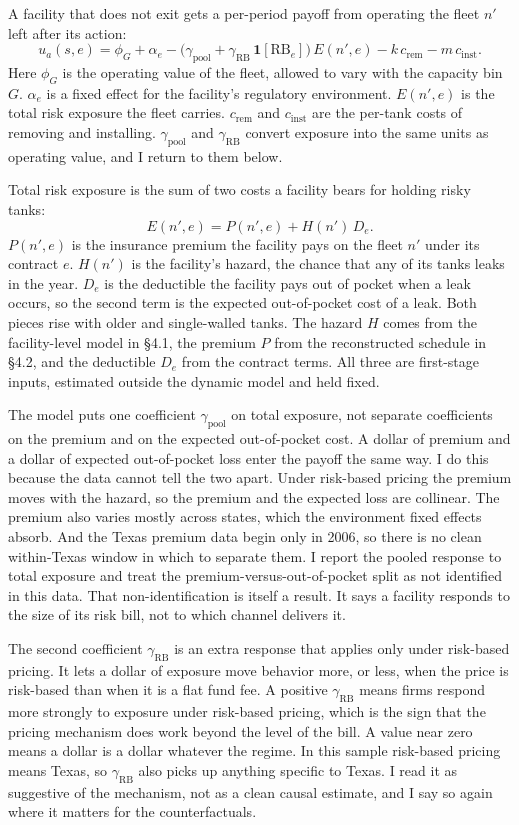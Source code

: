 \documentclass[
  12pt,
]{article}
\begin{document}
A facility that does not exit gets a per-period payoff from operating
the fleet \(n'\) left after its action:
\[u_a(s,e)=\phi_G+\alpha_e-\big(\gamma_{\text{pool}}+\gamma_{\text{RB}}\,\mathbf 1[\text{RB}_e]\big)\,E(n',e)-k\,c_{\text{rem}}-m\,c_{\text{inst}}.\]
Here \(\phi_G\) is the operating value of the fleet, allowed to vary
with the capacity bin \(G\). \(\alpha_e\) is a fixed effect for the
facility's regulatory environment. \(E(n',e)\) is the total risk
exposure the fleet carries. \(c_{\text{rem}}\) and \(c_{\text{inst}}\)
are the per-tank costs of removing and installing.
\(\gamma_{\text{pool}}\) and \(\gamma_{\text{RB}}\) convert exposure
into the same units as operating value, and I return to them below.

Total risk exposure is the sum of two costs a facility bears for holding
risky tanks: \[E(n',e)=P(n',e)+H(n')\,D_e.\] \(P(n',e)\) is the
insurance premium the facility pays on the fleet \(n'\) under its
contract \(e\). \(H(n')\) is the facility's hazard, the chance that any
of its tanks leaks in the year. \(D_e\) is the deductible the facility
pays out of pocket when a leak occurs, so the second term is the
expected out-of-pocket cost of a leak. Both pieces rise with older and
single-walled tanks. The hazard \(H\) comes from the facility-level
model in §4.1, the premium \(P\) from the reconstructed schedule in
§4.2, and the deductible \(D_e\) from the contract terms. All three are
first-stage inputs, estimated outside the dynamic model and held fixed.

The model puts one coefficient \(\gamma_{\text{pool}}\) on total
exposure, not separate coefficients on the premium and on the expected
out-of-pocket cost. A dollar of premium and a dollar of expected
out-of-pocket loss enter the payoff the same way. I do this because the
data cannot tell the two apart. Under risk-based pricing the premium
moves with the hazard, so the premium and the expected loss are
collinear. The premium also varies mostly across states, which the
environment fixed effects absorb. And the Texas premium data begin only
in 2006, so there is no clean within-Texas window in which to separate
them. I report the pooled response to total exposure and treat the
premium-versus-out-of-pocket split as not identified in this data. That
non-identification is itself a result. It says a facility responds to
the size of its risk bill, not to which channel delivers it.

The second coefficient \(\gamma_{\text{RB}}\) is an extra response that
applies only under risk-based pricing. It lets a dollar of exposure move
behavior more, or less, when the price is risk-based than when it is a
flat fund fee. A positive \(\gamma_{\text{RB}}\) means firms respond
more strongly to exposure under risk-based pricing, which is the sign
that the pricing mechanism does work beyond the level of the bill. A
value near zero means a dollar is a dollar whatever the regime. In this
sample risk-based pricing means Texas, so \(\gamma_{\text{RB}}\) also
picks up anything specific to Texas. I read it as suggestive of the
mechanism, not as a clean causal estimate, and I say so again where it
matters for the counterfactuals.
\end{document}
